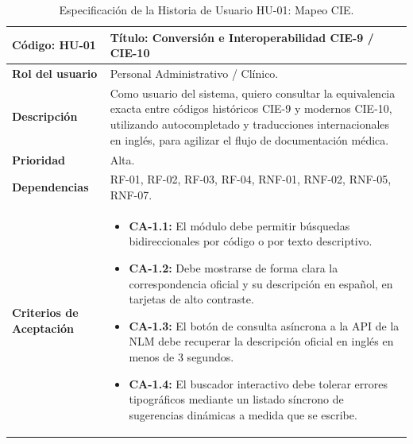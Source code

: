 \documentclass[12pt,a4paper,onecolumn,oneside]{report}
\begin{document}
\begin{table}[htbp]
\centering
\small
\renewcommand{\arraystretch}{1.0}
\begin{tabular}{|p{3.5cm}|p{10.5cm}|}
\hline
\rowcolor[RGB]{239,239,239} 
\textbf{Código: HU-01} & \textbf{Título: Conversión e Interoperabilidad CIE-9 / CIE-10} \\ \hline
\textbf{Rol del usuario} & Personal Administrativo / Clínico. \\ \hline
\textbf{Descripción} & Como usuario del sistema, quiero consultar la equivalencia exacta entre códigos históricos CIE-9 y modernos CIE-10, utilizando autocompletado y traducciones internacionales en inglés, para agilizar el flujo de documentación médica. \\ \hline
\textbf{Prioridad} & Alta. \\ \hline
\textbf{Dependencias} & RF-01, RF-02, RF-03, RF-04, RNF-01, RNF-02, RNF-05, RNF-07. \\ \hline
\textbf{Criterios de Aceptación} & 
\begin{itemize}[leftmargin=*]
    \item \textbf{CA-1.1:} El módulo debe permitir búsquedas bidireccionales por código o por texto descriptivo.
    \item \textbf{CA-1.2:} Debe mostrarse de forma clara la correspondencia oficial y su descripción en español, en tarjetas de alto contraste.
    \item \textbf{CA-1.3:} El botón de consulta asíncrona a la API de la NLM debe recuperar la descripción oficial en inglés en menos de 3 segundos.
    \item \textbf{CA-1.4:} El buscador interactivo debe tolerar errores tipográficos mediante un listado síncrono de sugerencias dinámicas a medida que se escribe.
\end{itemize} \\ \hline
\end{tabular}
\caption{Especificación de la Historia de Usuario HU-01: Mapeo CIE.}
\label{tab:hu_01}
\end{table}
\end{document}

